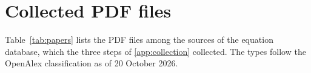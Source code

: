 \documentclass[uplatex,a4j,onecolumn,11pt,openany,english,oneside]{jsbook}
\def\thefigure{\arabic{figure}}
\def\thetable{\arabic{table}}
\renewcommand{\bibname}{References}
\newcommand{\PaperSectioning}{\let\subsection\section \let\section\chapter}
\begin{document}
\makeatletter
\renewcommand{\bibsection}{\chapter*{\bibname}\@mkboth{\bibname}{}\addcontentsline{toc}{chapter}{\bibname}}
\makeatother




\newpage
\appendix
\def\thechapter{Appendix \Alph{chapter}}
\makeatletter
{}
\renewcommand{\thefigure}{\Alph{chapter}.\arabic{figure}}
\renewcommand{\thetable}{\Alph{chapter}.\arabic{table}}
\makeatother
\begingroup
\PaperSectioning

\endgroup

\FloatBarrier
\chapter{Collected PDF files}\label{app:papers}
Table~\ref{tab:papers} lists the \NPdf{} PDF files among the sources of the equation database, which
the three steps of \ref{app:collection} collected. The types follow the OpenAlex classification as
of 20 October 2026.


\end{document}
